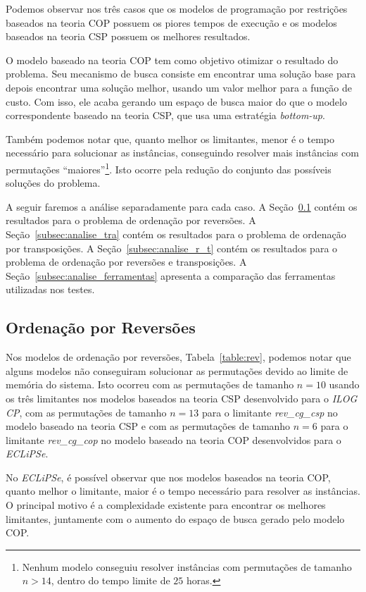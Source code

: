 Podemos observar nos três casos que os modelos de programação por
restrições baseados na teoria COP possuem os piores tempos de execução e
os modelos baseados na teoria CSP possuem os melhores resultados.

O modelo baseado na teoria COP tem como objetivo otimizar o resultado do
problema. Seu mecanismo de busca consiste em encontrar uma solução base
para depois encontrar uma solução melhor, usando um valor melhor para a
função de custo. Com isso, ele acaba gerando um espaço de busca maior do
que o modelo correspondente baseado na teoria CSP, que usa uma
estratégia \textit{bottom-up}.

Também podemos notar que, quanto melhor os limitantes, menor é o tempo
necessário para solucionar as instâncias, conseguindo resolver mais
instâncias com permutações ``maiores''\footnote{Nenhum modelo conseguiu
resolver instâncias com permutações de tamanho $n > 14$, dentro do
tempo limite de $25$ horas.}. Isto ocorre pela redução do conjunto das
possíveis soluções do problema.

A seguir faremos a análise separadamente para cada caso. A
Seção~\ref{subsec:analise_rev} contém os resultados para o problema de
ordenação por reversões. A Seção~\ref{subsec:analise_tra} contém os
resultados para o problema de ordenação por transposições. A
Seção~\ref{subsec:analise_r_t} contém os resultados para o problema de
ordenação por reversões e transposições. A
Seção~\ref{subsec:analise_ferramentas} apresenta a comparação das
ferramentas utilizadas nos testes.

\subsection{Ordenação por Reversões}
\label{subsec:analise_rev}
Nos modelos de ordenação por reversões, Tabela~\ref{table:rev}, podemos
notar que alguns modelos não conseguiram solucionar as permutações
devido ao limite de memória do sistema. Isto ocorreu com as permutações
de tamanho $n = 10$ usando os três limitantes nos modelos baseados na
teoria CSP desenvolvido para o \textit{ILOG CP}, com as permutações de
tamanho $n = 13$ para o limitante \textit{rev\_cg\_csp} no modelo
baseado na teoria CSP e com as permutações de tamanho $n = 6$ para o
limitante \textit{rev\_cg\_cop} no modelo baseado na teoria COP
desenvolvidos para o \textit{ECLiPSe}.

No \textit{ECLiPSe}, é possível observar que nos modelos baseados na
teoria COP, quanto melhor o limitante, maior é o tempo necessário para
resolver as instâncias. O principal motivo é a complexidade existente
para encontrar os melhores limitantes, juntamente com o aumento do
espaço de busca gerado pelo modelo COP. 

